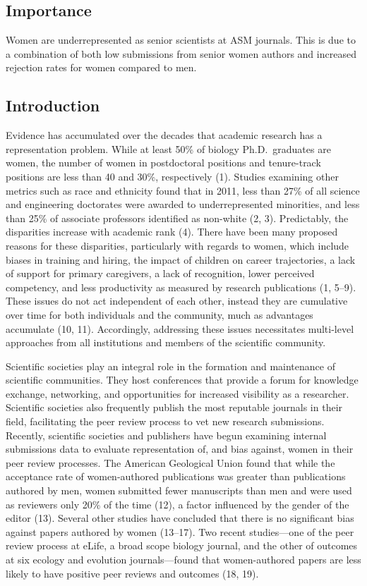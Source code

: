 \documentclass[11pt,]{article}
\begin{document}
\subsection{Importance}\label{importance}

Women are underrepresented as senior scientists at ASM journals. This is
due to a combination of both low submissions from senior women authors
and increased rejection rates for women compared to men.

\subsection{Introduction}\label{introduction}

Evidence has accumulated over the decades that academic research has a
representation problem. While at least 50\% of biology Ph.D.~graduates
are women, the number of women in postdoctoral positions and
tenure-track positions are less than 40 and 30\%, respectively (1).
Studies examining other metrics such as race and ethnicity found that in
2011, less than 27\% of all science and engineering doctorates were
awarded to underrepresented minorities, and less than 25\% of associate
professors identified as non-white (2, 3). Predictably, the disparities
increase with academic rank (4). There have been many proposed reasons
for these disparities, particularly with regards to women, which include
biases in training and hiring, the impact of children on career
trajectories, a lack of support for primary caregivers, a lack of
recognition, lower perceived competency, and less productivity as
measured by research publications (1, 5--9). These issues do not act
independent of each other, instead they are cumulative over time for
both individuals and the community, much as advantages accumulate (10,
11). Accordingly, addressing these issues necessitates multi-level
approaches from all institutions and members of the scientific
community.

Scientific societies play an integral role in the formation and
maintenance of scientific communities. They host conferences that
provide a forum for knowledge exchange, networking, and opportunities
for increased visibility as a researcher. Scientific societies also
frequently publish the most reputable journals in their field,
facilitating the peer review process to vet new research submissions.
Recently, scientific societies and publishers have begun examining
internal submissions data to evaluate representation of, and bias
against, women in their peer review processes. The American Geological
Union found that while the acceptance rate of women-authored
publications was greater than publications authored by men, women
submitted fewer manuscripts than men and were used as reviewers only
20\% of the time (12), a factor influenced by the gender of the editor
(13). Several other studies have concluded that there is no significant
bias against papers authored by women (13--17). Two recent studies---one
of the peer review process at eLife, a broad scope biology journal, and
the other of outcomes at six ecology and evolution journals---found that
women-authored papers are less likely to have positive peer reviews and
outcomes (18, 19).
\end{document}
